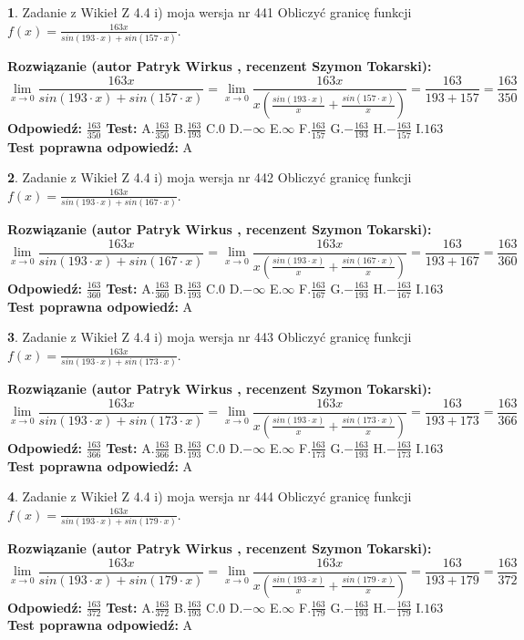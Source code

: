 \documentclass[12pt, a4paper]{article}
\theoremstyle{definition} %
\newtheorem{zad}{}
\newcommand{\zadStart}[1]{\begin{zad}#1\newline}
\newcommand{\zadStop}{\end{zad}}
\newcommand{\rozwStart}[2]{\noindent \textbf{Rozwiązanie (autor #1 , recenzent #2): }\newline}
\newcommand{\rozwStop}{\newline}
\newcommand{\odpStart}{\noindent \textbf{Odpowiedź:}\newline}
\newcommand{\odpStop}{\newline}
\newcommand{\testStart}{\noindent \textbf{Test:}\newline}
\newcommand{\testStop}{\newline}
\newcommand{\kluczStart}{\noindent \textbf{Test poprawna odpowiedź:}\newline}
\newcommand{\kluczStop}{\newline}
\begin{document}
\zadStart{Zadanie z Wikieł Z 4.4 i) moja wersja nr 441}
Obliczyć granicę funkcji $f(x)=\frac{163x}{sin(193\cdot x) +sin(157\cdot x)}$.
\zadStop
\rozwStart{Patryk Wirkus}{Szymon Tokarski}
$$\lim\limits_{x\to 0}\frac{163x}{sin(193\cdot x) +sin(157\cdot x)}=\lim\limits_{x\to 0}\frac{163x}{x(\frac{sin(193\cdot x)}{x}+\frac{sin(157\cdot x)}{x})}=\frac{163}{193+157} = \frac{163}{350}$$
\rozwStop
\odpStart
$\frac{163}{350}$
\odpStop
\testStart
A.$\frac{163}{350}$
B.$\frac{163}{193}$
C.$0$
D.$-\infty$
E.$\infty$
F.$\frac{163}{157}$
G.$-\frac{163}{193}$
H.$-\frac{163}{157}$
I.$163$
\testStop
\kluczStart
A
\kluczStop



\zadStart{Zadanie z Wikieł Z 4.4 i) moja wersja nr 442}
Obliczyć granicę funkcji $f(x)=\frac{163x}{sin(193\cdot x) +sin(167\cdot x)}$.
\zadStop
\rozwStart{Patryk Wirkus}{Szymon Tokarski}
$$\lim\limits_{x\to 0}\frac{163x}{sin(193\cdot x) +sin(167\cdot x)}=\lim\limits_{x\to 0}\frac{163x}{x(\frac{sin(193\cdot x)}{x}+\frac{sin(167\cdot x)}{x})}=\frac{163}{193+167} = \frac{163}{360}$$
\rozwStop
\odpStart
$\frac{163}{360}$
\odpStop
\testStart
A.$\frac{163}{360}$
B.$\frac{163}{193}$
C.$0$
D.$-\infty$
E.$\infty$
F.$\frac{163}{167}$
G.$-\frac{163}{193}$
H.$-\frac{163}{167}$
I.$163$
\testStop
\kluczStart
A
\kluczStop



\zadStart{Zadanie z Wikieł Z 4.4 i) moja wersja nr 443}
Obliczyć granicę funkcji $f(x)=\frac{163x}{sin(193\cdot x) +sin(173\cdot x)}$.
\zadStop
\rozwStart{Patryk Wirkus}{Szymon Tokarski}
$$\lim\limits_{x\to 0}\frac{163x}{sin(193\cdot x) +sin(173\cdot x)}=\lim\limits_{x\to 0}\frac{163x}{x(\frac{sin(193\cdot x)}{x}+\frac{sin(173\cdot x)}{x})}=\frac{163}{193+173} = \frac{163}{366}$$
\rozwStop
\odpStart
$\frac{163}{366}$
\odpStop
\testStart
A.$\frac{163}{366}$
B.$\frac{163}{193}$
C.$0$
D.$-\infty$
E.$\infty$
F.$\frac{163}{173}$
G.$-\frac{163}{193}$
H.$-\frac{163}{173}$
I.$163$
\testStop
\kluczStart
A
\kluczStop



\zadStart{Zadanie z Wikieł Z 4.4 i) moja wersja nr 444}
Obliczyć granicę funkcji $f(x)=\frac{163x}{sin(193\cdot x) +sin(179\cdot x)}$.
\zadStop
\rozwStart{Patryk Wirkus}{Szymon Tokarski}
$$\lim\limits_{x\to 0}\frac{163x}{sin(193\cdot x) +sin(179\cdot x)}=\lim\limits_{x\to 0}\frac{163x}{x(\frac{sin(193\cdot x)}{x}+\frac{sin(179\cdot x)}{x})}=\frac{163}{193+179} = \frac{163}{372}$$
\rozwStop
\odpStart
$\frac{163}{372}$
\odpStop
\testStart
A.$\frac{163}{372}$
B.$\frac{163}{193}$
C.$0$
D.$-\infty$
E.$\infty$
F.$\frac{163}{179}$
G.$-\frac{163}{193}$
H.$-\frac{163}{179}$
I.$163$
\testStop
\kluczStart
A
\kluczStop
\end{document}
